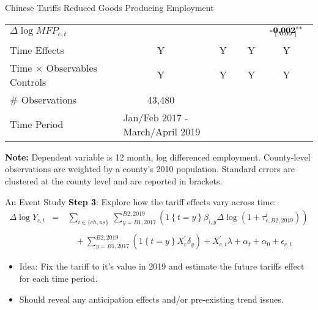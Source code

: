 \documentclass[9pt,pdftex,aspectratio=1610]{beamer}
\theoremstyle{definition}
\begin{document}
\begin{frame}[t]{Chinese Tariffs Reduced Goods Producing Employment}
\begin{table}[t]
\begin{center}
\begin{tabular}{l c c c c}
$\Delta \log MFP_{c,t}$
&
&
&
& $\begin{array}{c}\textbf{-0.002}^{**}  \vspace{-.32cm}\\ \scriptstyle \phantom{-}[ \ 0.00 \ ]\phantom{^{**}} \end{array}$
\\

Time Effects            &Y & Y  & Y & Y \\
Time $\times$ Observables Controls    &Y & Y  & Y & Y \\
\hline
\# Observations & 43,480 \\
Time Period & \multicolumn{2}{l}{Jan/Feb 2017 - March/April 2019}\\
\hline
\end{tabular}
\parbox[c]{4.1in}{\vspace{.1cm}
{\footnotesize \textbf{Note:} Dependent variable is 12 month, log differenced employment. County-level observations are weighted by a county's 2010 population. Standard errors are clustered at the county level and are reported in brackets.}}
\end{center}
\end{table}
\end{frame}



\begin{frame}[t]{An Event Study}
\textbf{Step 3}: Explore how the tariff effects vary across time:
\begin{eqnarray*}
\Delta \log Y_{c,t}   &=& \ \sum_{i\in \{ch, us\}} \ \sum_{y = B1, 2017}^{B2, 2019}  \left( \mathrm{1} \left\{t = y \right\} \beta_{i,y} \Delta \log(1 + \tau^{i}_{c,B2,2019})\right)\\
\nonumber \\
&&  \ \ \ \ \
+  \sum_{y = B1, 2017}^{B2, 2019}\left( \mathrm{1} \left\{t = y \right\} X^{'}_{c}\delta_y \right) + X^{'}_{c,t}\lambda + \alpha_t + \alpha_0 +  \epsilon_{c,t}
\end{eqnarray*}
\begin{itemize}
\smallskip
\item Idea: Fix the tariff to it's value in 2019 and estimate the future tariffs effect for each time period.
\smallskip
\item Should reveal any anticipation effects and/or pre-existing trend issues.
\end{itemize}
\end{frame}
\end{document}
